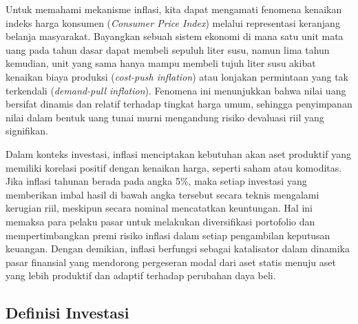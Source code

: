\begin{example}
    Untuk memahami mekanisme inflasi, kita dapat mengamati fenomena kenaikan indeks harga konsumen (\textit{Consumer Price Index}) melalui representasi keranjang belanja masyarakat. Bayangkan sebuah sistem ekonomi di mana satu unit mata uang pada tahun dasar dapat membeli sepuluh liter susu, namun lima tahun kemudian, unit yang sama hanya mampu membeli tujuh liter susu akibat kenaikan biaya produksi (\textit{cost-push inflation}) atau lonjakan permintaan yang tak terkendali (\textit{demand-pull inflation}). Fenomena ini menunjukkan bahwa nilai uang bersifat dinamis dan relatif terhadap tingkat harga umum, sehingga penyimpanan nilai dalam bentuk uang tunai murni mengandung risiko devaluasi riil yang signifikan.

    Dalam konteks investasi, inflasi menciptakan kebutuhan akan aset produktif yang memiliki korelasi positif dengan kenaikan harga, seperti saham atau komoditas. Jika inflasi tahunan berada pada angka 5\%, maka setiap investasi yang memberikan imbal hasil di bawah angka tersebut secara teknis mengalami kerugian riil, meskipun secara nominal mencatatkan keuntungan. Hal ini memaksa para pelaku pasar untuk melakukan diversifikasi portofolio dan mempertimbangkan premi risiko inflasi dalam setiap pengambilan keputusan keuangan. Dengan demikian, inflasi berfungsi sebagai katalisator dalam dinamika pasar finansial yang mendorong pergeseran modal dari aset statis menuju aset yang lebih produktif dan adaptif terhadap perubahan daya beli.
\end{example}

\subsection{Definisi Investasi}

